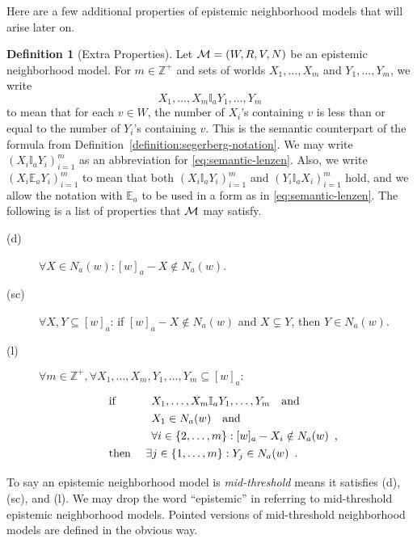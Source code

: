 \documentclass[12pt]{article}
\theoremstyle{definition}
\newtheorem{definition}[theorem]{Definition}
\newcommand{\Int}{\mathbb{Z}}  %
\newcommand{\M}{{\cal M}}      %
\newcommand{\Lang}{{\cal L}}   %
\newcommand{\KB}{{\mathsf{KB}}}                        %
\newcommand{\semn}[1]{\llbracket{#1}\rrbracket_{\mathsf{n}}} %
\begin{document}
Here are a few additional properties of epistemic neighborhood models
that will arise later on.

\begin{definition}[Extra Properties]
  \label{definition:extra-properties}
  Let $\M=(W,R,V,N)$ be an epistemic neighborhood model.  
  For $m\in\Int^+$ and sets
  of worlds $X_1,\dots,X_m$ and $Y_1,\dots,Y_m$,
  we write
  \begin{equation}
    X_1,\dots,X_m\mathbb{I}_aY_1,\dots,Y_m
    \label{eq:semantic-lenzen}
  \end{equation}
  to mean that for each $v\in W$, the number of $X_i$'s containing $v$
  is less than or equal to the number of $Y_i$'s containing $v$. This is the
  semantic counterpart of the formula from
  Definition~\ref{definition:segerberg-notation}.  We may write
  $(X_i\mathbb{I}_aY_i)_{i=1}^m$ as an abbreviation for
  \eqref{eq:semantic-lenzen}.  Also, we write
  $(X_i\mathbb{E}_aY_i)_{i=1}^m$ to mean that both
  $(X_i\mathbb{I}_aY_i)_{i=1}^m$ and $(Y_i\mathbb{I}_aX_i)_{i=1}^m$
  hold, and we allow the notation with $\mathbb{E}_a$ to be used in a
  form as in \eqref{eq:semantic-lenzen}.  The following is a list of
  properties that $\M$ may satisfy.
  \begin{description}
  \item[(d)] $\forall X \in N_a(w): [w]_a - X \notin  N_a(w)$.

 
  \item[(sc)] $\forall X,Y\subseteq[w]_a$:
    if $[w]_a-X\notin N_a(w)$ and $X\subsetneq Y$, then
    $Y\in N_a(w)$.

  \item[(l)] $\forall m\in\Int^+,\forall
  X_1,\dots,X_m,Y_1,\dots,Y_m\subseteq[w]_a:$
  \[
  \renewcommand{\arraystretch}{1.3}
  \begin{array}{ll}
    \text{if }
    &
    \begin{array}[t]{l}
      X_1,\dots,X_m\mathbb{I}_aY_1,\dots,Y_m\quad\text{and}
      \\
      X_1\in N_a(w)\quad\text{and}
      \\
      \forall i\in\{2,\dots,m\}:
      [w]_a-X_i\notin N_a(w) \enspace\text{,}
    \end{array}
    \\
    \text{then }
    &
    \exists j\in\{1,\dots,m\}: Y_j\in N_a(w)\enspace\text{.}
  \end{array}
  \]
  \end{description}
  To say an epistemic neighborhood model is \emph{mid-threshold} means
  it satisfies (d), (sc), and (l).  We may drop the word ``epistemic''
  in referring to mid-threshold epistemic neighborhood models.
  Pointed versions of mid-threshold neighborhood models are defined in
  the obvious way.
\end{definition}
\end{document}
